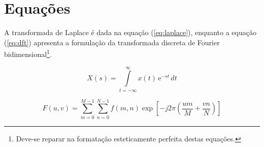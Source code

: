\section{Equações}
\label{sec:equacoes}

A transformada de Laplace é dada na equação (\ref{eq:laplace}), enquanto a equação (\ref{eq:dft}) apresenta a formulação da transformada discreta de Fourier bidimensional\footnote{Deve-se reparar na formatação esteticamente perfeita destas equações.}.

\begin{equation}
	X(s) = \int\limits_{t = -\infty}^{\infty} x(t) \, \text{e}^{-st} \, dt
	\label{eq:laplace}
\end{equation}

\begin{equation}
	F(u, v) = \sum_{m = 0}^{M - 1} \sum_{n = 0}^{N - 1} f(m, n) \exp \left[ -j 2 \pi \left( \frac{u m}{M} + \frac{v n}{N} \right) \right]
	\label{eq:dft}
\end{equation}
